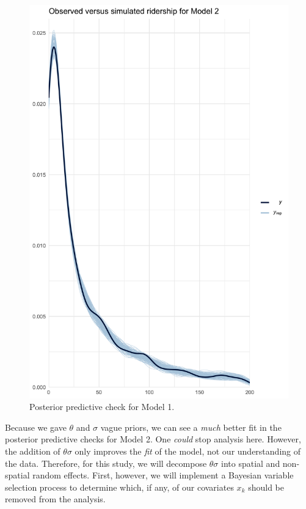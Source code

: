 \documentclass[
]{article}
\begin{document}
\begin{figure}[H]
  \centering
  \includegraphics[width = 6in]{ppcheckmod2.png}
  \caption{Posterior predictive check for Model 1.}
\end{figure}

Because we gave \(\theta\) and \(\sigma\) vague priors, we can see a
\emph{much} better fit in the posterior predictive checks for Model 2.
One \emph{could} stop analysis here. However, the addition of
\(\theta \sigma\) only improves the \emph{fit} of the model, not our
understanding of the data. Therefore, for this study, we will decompose
\(\theta \sigma\) into spatial and non-spatial random effects. First,
however, we will implement a Bayesian variable selection process to
determine which, if any, of our covariates \(x_k\) should be removed
from the analysis.
\end{document}
